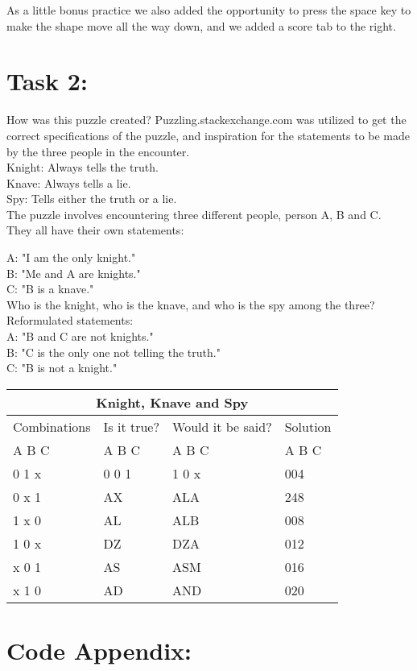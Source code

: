 \documentclass[11pt]{amsart}
\begin{document}
As a little bonus practice we also added the opportunity to press the space key to make the shape move all the way down, and we added a score tab to the right.\\

\section{Task 2:}

How was this puzzle created?
	Puzzling.stackexchange.com was utilized to get the correct specifications of the puzzle,
	and inspiration for the statements to be made by the three people in the encounter. \\

Knight: Always tells the truth.\\
Knave: 	Always tells a lie.\\
Spy: 		Tells either the truth or a lie. \\

The puzzle involves encountering three different people, person A, B and C. \\

They all have their own statements:

	A: "I am the only knight."\\
	B: "Me and A are knights."\\
	C: "B is a knave." \\

Who is the knight, who is the knave, and who is the spy among the three? \\


Reformulated statements:\\

	A: "B and C are not knights."\\
	B: "C is the only one not telling the truth."\\
	C: "B is not a knight." \\



	\begin{tabular}{ |p{3cm}||p{3cm}|p{3cm}|p{3cm}|  }
	 \hline
	 \multicolumn{4}{|c|}{Knight, Knave and Spy} \\
	 \hline
	 Combinations & Is it true? & Would it be said? & Solution  \\ A  B  C   &   A  B  C  &   A  B  C & A  B  C \\
	 \hline
	 0  1  x   & 0  0  1    & 1  0  x&   004\\
	 0  x  1&   AX  & ALA   &248\\
	 1  x  0 &AL & ALB&  008\\
	 1  0  x    &DZ & DZA&  012\\
	 x  0  1&   AS  & ASM&016\\
	 x  1  0& AD  & AND   &020\\

	 
	 \hline
	\end{tabular}


\section{Code Appendix:}

\begin{verbatim}



\end{verbatim}
\end{document}

